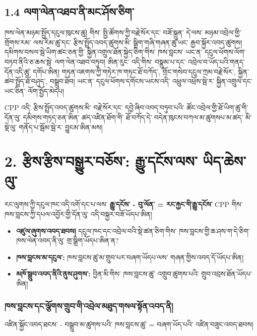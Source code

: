 \documentclass[11pt]{article}
\begin{document}
\subsection*{1.4 ལག་ལེན་འཐབ་ནི་མང་ཤོས་ཅིག་}

ཁས་ལེན་མཉམ་སྤྱོད་དངུལ་ཁུངས་ཚུ། གིས་ སྤྱི་ཚོགས་ཀྱི་བརྗེ་སོར་དང་ བཟོ་སྐྲུན་ དེ་ལས་ མཉམ་འབྲེལ་གྱི་གྲོགས་རམ་ ལས་རིམ་ཚུ་དང་ རྩིས་སྤྲོད་འབད་ཚུགས་མི་ སྒྲིག་གཞི་གཞན་ཚུ་ཡང་ རྒྱབ་སྐྱོར་འབད་ཚུགས། དམིགས་བསལ་སྦེ་ཡིག་ཚང་ཅན་གྱི་ སྐྱིན་འགྲུལ་ཐོན་སྐྱེད་ཅིག་གིས་ ཁས་བླངས་ ཡང་ན་ དངུལ་ཕོགས་ལོག་བཏབ་ནིའི་ཅ་ཆས་སྦེ་ ལག་ལེན་འཐབ་བཏུབ། ཨིན་རུང་ འདི་གིས་ བསྣུམ་པ་དང་ འབྲེལ་བ་ཡོད་པའི་གནད་དོན་འདི་ཚུ་ དགོཔ་ཨིན། གཏན་འཇགས་ཀྱི་གཏེར་ཁ་གཏང་ཐོ་བཀོད་, གྲོང་གསེབ་དངུལ་ཀྲམ་བརྗེ་སོར་, སྐྱིན་ཚབ་སྤྲོད་ཐོ་བཤུད་, བསྒྲུབ་ཐོབ། ཡང་ན་ དངུལ་ཕོགས་དགོངས་ཡངས་འདི་ འཕྲུལ་འཕྲོས་སྦེ་ར་ སྐྱིན་འགྲུལ་དང་ ཡང་ཅིན་ ལོག་སྤྱོད་མེདཔ།

CPP འདི་ རྩིས་སྤྲོད་འབད་ཚུགས་མི་ བརྗེ་སོར་དང་ དབྱེ་ཞིབ་འབད་བཏུབ་པའི་ ཚོང་འབྲེལ་གྱི་ཐོ་ཡིག་ཚུ་གི་དོན་ལུ་ དམིགས་གཏད་ཅན་ཨིན་ ཚད་འཛིན་ཐོག་གི་ ཐོ་བཀོད་དེ་ བདེན་ཁུངས་བཀལ་མ་ཚུགསཔ་མ་ཚད་ མི་སྡེ་ལུ་ གནོད་པ་སྦོམ་སྦེ་ར་ བྱུངམ་ཨིན་མས།


\section*{2. རྩིས་རྩིས་བསྒྱུར་བཅོས་: རྒྱུ་དངོས་ལས་ ཡིད་ཆེས་ལུ་}

རང་ལུགས་ཀྱི་དངུལ་ཁང་འདི་འགོ་དང་པ་ལས་ \textbf{རྒྱུ་དངོས་ - བུ་ལོན་ = རང་རྐྱང་གི་རྒྱུ་དངོས་} CPP གིས་ ཁས་བླངས་ཀྱི་དཔལ་འབྱོར་གྱི་དོན་ལུ་ འདི་བསྐྱར་བཟོ་ཡོདཔ་ཨིན།

\begin{itemize}[leftmargin=*]
\item \textbf{འཛུལ་ཞུགས་འབད་ཐབས།} དངུལ་ཁང་དང་འབྲེལ་བའི་སྡེ་ཚན་ཅིག་གིས་ ཁས་བླངས་གྱི་ཆ་ཤས་ག་དེ་ཅིག་ཁས་ལེན་འབད་ནི་ལུ་ གྲ་སྒྲིག་ཡོདཔ་ཨིན་ན?
\item \textbf{ཁས་བླངས་མ་དངུལ་:} ཁས་བླངས་ཚུ་མ་གྲུབ་པར་བཞག་ཡོདཔ་ལས་ གཞན་གྱིས་འབད་དོ་ཡོདཔ་ཨིན།
\item \textbf{མཁོ་སྒྲུབ་འབད་ནིའི་ནུས་ཤུགས་:} བྱིན་མི་གིས་ ཁས་བླངས་ཚུ་ འགྲུབ་ཚུགས་པའི་ གྲུབ་འབྲས་ཐོན་ཡོདཔ་ཨིན།
\end{itemize}
\subsubsection*{ཁས་བླངས་དང་ལྕོགས་གྲུབ་གི་འབྲེལ་མཐུད་གསལ་སྟོན་འབད་ནི།}

འཛིན་སྐྱོང་འབད་ཐངས་ - བསྒྲུབ་མ་ཚུགས་པའི་ ཁས་བླངས་ཚུ་ = བཞག་ཡོད་པའི་ འཛིན་བཟུང་འབད་ཐབས།
\end{document}
